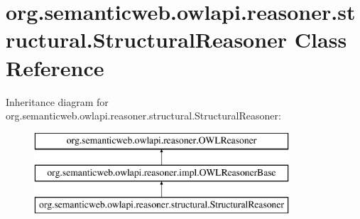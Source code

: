 \hypertarget{classorg_1_1semanticweb_1_1owlapi_1_1reasoner_1_1structural_1_1_structural_reasoner}{\section{org.\-semanticweb.\-owlapi.\-reasoner.\-structural.\-Structural\-Reasoner Class Reference}
\label{classorg_1_1semanticweb_1_1owlapi_1_1reasoner_1_1structural_1_1_structural_reasoner}
}
Inheritance diagram for org.\-semanticweb.\-owlapi.\-reasoner.\-structural.\-Structural\-Reasoner\-:\begin{figure}[H]
\begin{center}
\leavevmode
\includegraphics[height=3.000000cm]{classorg_1_1semanticweb_1_1owlapi_1_1reasoner_1_1structural_1_1_structural_reasoner}
\end{center}
\end{figure}
